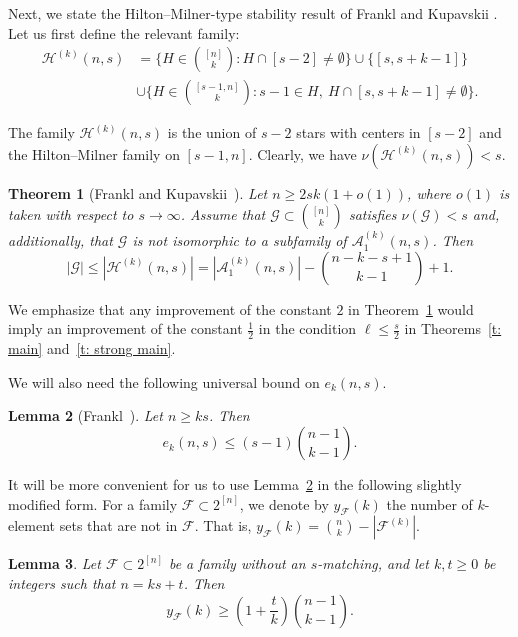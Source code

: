\documentclass{article}
\newtheorem{theorem}{Theorem}
\newtheorem{lemma}[theorem]{Lemma}
\newcommand{\m}{\mathcal}
\begin{document}
Next, we state the Hilton--Milner-type stability result of Frankl and Kupavskii \cite{FK6}. Let us first define the relevant family:
\begin{align*}
    \mathcal{H}^{(k)}(n, s)
    &= \Big\{H \in {[n] \choose k}: H \cap [s-2] \neq \emptyset \Big\} \cup \{[s, s+k-1]\} \\
    &\cup  \Big\{H \in {[s-1,n] \choose k}: s-1\in H,\ H \cap [s, s+k-1] \ne \emptyset \Big\}.
\end{align*}

The family $\mathcal{H}^{(k)}(n, s)$ is the union of $s-2$ stars with centers in $[s-2]$ and the Hilton--Milner family on $[s-1,n]$. Clearly, we have $\nu(\mathcal{H}^{(k)}(n, s)) < s$.

\begin{theorem}[Frankl and Kupavskii~\cite{FK6}] \label{t: Hilton-Milner for EMC}
    Let $n \geq 2sk(1+o(1))$, where $o(1)$ is taken with respect to $s \to \infty$. Assume that $\mathcal{G}\subset {[n]\choose k}$ satisfies $\nu(\mathcal{G}) < s$ and, additionally, that $\mathcal{G}$ is not isomorphic to a subfamily of $\mathcal{A}_1^{(k)}(n,s)$. Then
    \[
    |\mathcal{G}| \leq |\mathcal{H}^{(k)}(n, s)| = |\mathcal{A}_1^{(k)}(n,s)| - {n - k - s + 1 \choose k - 1} + 1.
    \]
\end{theorem}

We emphasize that any improvement of the constant $2$ in Theorem~\ref{t: Hilton-Milner for EMC} would imply an improvement of the constant $\frac{1}{2}$ in the condition $\ell \leq \frac{s}{2}$ in Theorems~\ref{t: main} and~\ref{t: strong main}.

We will also need the following universal bound on $e_k(n, s)$.

\begin{lemma}[Frankl~\cite{F3}] \label{l.frankl_shifting}
    Let $n \geq ks$. Then
    \[
    e_k(n, s) \leq (s-1){n - 1 \choose k - 1}.
    \]
\end{lemma}

It will be more convenient for us to use Lemma~\ref{l.frankl_shifting} in the following slightly modified form. For a family $\m F\subset 2^{[n]}$, we denote by $y_{\mathcal{F}}(k)$ the number of $k$-element sets that are not in $\mathcal{F}$. That is, $y_{\mathcal{F}}(k) = {n \choose k} - |\mathcal{F}^{(k)}|$.


\begin{lemma} \label{l.frankl_shifting modified}
    Let $\mathcal{F} \subset 2^{[n]}$ be a family without an $s$-matching, and let $k, t \geq 0$ be integers such that $n = ks + t$. Then
    \[
        y_{\mathcal{F}}(k) \geq \left(1+\frac{t}{k}\right){n-1 \choose k - 1}.
    \]
\end{lemma}
\end{document}
